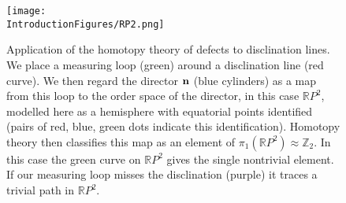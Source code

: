 \begin{figure}[htbp]
\centering
\texttt{[image: \\IntroductionFigures/RP2.png]}
\caption[The homotopy theory of defects.]{Application of the homotopy theory of defects to disclination lines. We place a measuring loop (green) around a disclination line (red curve). We then regard the director $\bf n$ (blue cylinders) as a map from this loop to the order space of the director, in this case $\mathbb{R}P^2$, modelled here as a hemisphere with equatorial points identified (pairs of red, blue, green dots indicate this identification). Homotopy theory then classifies this map as an element of $\pi_1(\mathbb{R}P^2) \approx \mathbb{Z}_2$. In this case the green curve on $\mathbb{R}P^2$ gives the single nontrivial element. If our measuring loop misses the disclination (purple) it traces a trivial path in $\mathbb{R}P^2$.}
\label{fig:RP2}
\end{figure}

